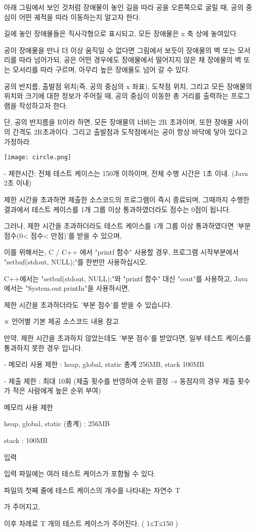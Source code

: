 \documentclass [12pt] {oblivoir}
\begin{document}
아래 그림에서 보인 것처럼 장애물이 놓인 길을 따라 공을 오른쪽으로 굴릴 때, 공의 중심이 어떤 궤적을 따라 이동하는지 알고자 한다.

길에 놓인 장애물들은 직사각형으로 표시되고, 모든 장애물은 x 축 상에 놓여있다.

공이 장애물을 만나 더 이상 움직일 수 없다면 그림에서 보듯이 장애물의 벽 또는 모서리를 따라 넘어가되, 공은 어떤 경우에도 장애물에서 떨어지지 않은 채 장애물의 벽 또는 모서리를 따라 구르며, 아무리 높은 장애물도 넘어 갈 수 있다.
\par
공의 반지름, 출발점 위치(즉, 공의 중심의 x 좌표), 도착점 위치, 그리고 모든 장애물의 위치와 크기에 대한 정보가 주어질 때, 공의 중심이 이동한 총 거리를 출력하는 프로그램을 작성하고자 한다.
\par
단, 공의 반지름을 R이라 하면, 모든 장애물의 너비는 2R 초과이며, 또한 장애물 사이의 간격도 2R초과이다. 그리고 출발점과 도착점에서는 공이 항상 바닥에 닿아 있다고 가정하라.
\par
\texttt{[image: circle.png]}
\par
- 제한시간: 전체 테스트 케이스는 150개 이하이며, 전체 수행 시간은 1초 이내. (Java 2초 이내)
\par
제한 시간을 초과하면 제출한 소스코드의 프로그램이 즉시 종료되며, 그때까지 수행한 결과에서 테스트 케이스를 1개 그룹 이상 통과하였더라도 점수는 0점이 됩니다.

그러나, 제한 시간을 초과하더라도 테스트 케이스를 1개 그룹 이상 통과하였다면 '부분 점수(0< 점수< 만점)'를 받을 수 있으며,

이를 위해서는, C / C++ 에서 "printf 함수" 사용할 경우, 프로그램 시작부분에서 "setbuf(stdout, NULL);"를 한번만 사용하십시오.

C++에서는 "setbuf(stdout, NULL);"와 "printf 함수" 대신 "cout"를 사용하고, Java에서는 "System.out.printIn"을 사용하시면,

제한 시간을 초과하더라도 '부분 점수'를 받을 수 있습니다.
\par
※ 언어별 기본 제공 소스코드 내용 참고
\par
만약, 제한 시간을 초과하지 않았는데도 '부분 점수'를 받았다면, 일부 테스트 케이스를 통과하지 못한 경우 입니다.
\par
- 메모리 사용 제한 : heap, global, static 총계 256MB, stack 100MB
\par
- 제출 제한 : 최대 10회 (제출 횟수를 반영하여 순위 결정 → 동점자의 경우 제출 횟수가 적은 사람에게 높은 순위 부여)
\par
메모리 사용 제한
\par
heap, global, static (총계) : 256MB
\par
stack : 100MB
\par
입력
\par
입력 파일에는 여러 테스트 케이스가 포함될 수 있다.
\par
파일의 첫째 줄에 테스트 케이스의 개수를 나타내는 자연수 T
\par
가 주어지고,
\par
이후 차례로  T 개의 테스트 케이스가 주어진다. ( 1≤T≤150 )
\par
\end{document}
